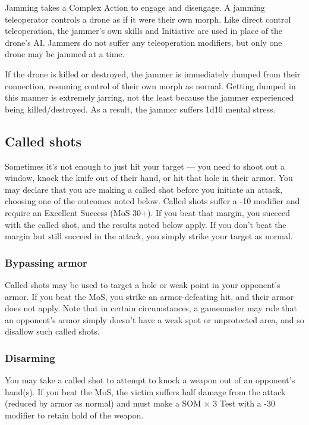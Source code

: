 Jamming takes a Complex Action to engage and disengage. A jamming teleoperator controls a drone as if it were their own morph. Like direct control teleoperation, the jammer’s own skills and Initiative are used in place of the drone’s AI. Jammers do not suffer any teleoperation modifiers, but only one drone may be jammed at a time. 

If the drone is killed or destroyed, the jammer is immediately dumped from their connection, resuming control of their own morph as normal. Getting dumped in this manner is extremely jarring, not the least because the jammer experienced being killed/destroyed. As a result, the jammer suffers 1d10 mental stress. 



\subsection{Called shots} \label{sec:called-shots} 

Sometimes it’s not enough to just hit your target --- you need to shoot out a window, knock the knife out of their hand, or hit that hole in their armor. You may declare that you are making a called shot before you initiate an attack, choosing one of the outcomes noted below. Called shots suffer a -10 modifier and require an Excellent Success (MoS 30+). If you beat that margin, you succeed with the called shot, and the results noted below apply. If you don’t beat the margin but still succeed in the attack, you simply strike your target as normal. 

\subsubsection{Bypassing armor} 

Called shots may be used to target a hole or weak point in your opponent’s armor. If you beat the MoS, you strike an armor-defeating hit, and their armor does not apply. Note that in certain circumstances, a gamemaster may rule that an opponent’s armor simply doesn’t have a weak spot or unprotected area, and so disallow such called shots. 

\subsubsection{Disarming} 

You may take a called shot to attempt to knock a weapon out of an opponent’s hand(s). If you beat the MoS, the victim suffers half damage from the attack (reduced by armor as normal) and must make a SOM $\times$ 3 Test with a -30 modifier to retain hold of the weapon. 

